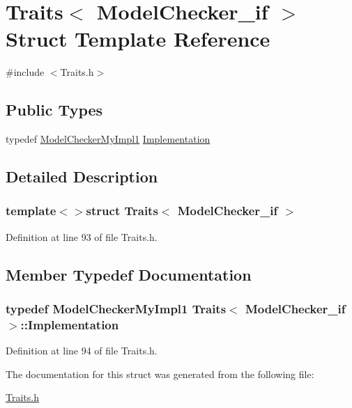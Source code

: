 \hypertarget{struct_traits_3_01_model_checker__if_01_4}{\section{Traits$<$ Model\-Checker\-\_\-if $>$ Struct Template Reference}
\label{struct_traits_3_01_model_checker__if_01_4}
}


{\ttfamily \#include $<$Traits.\-h$>$}

\subsection*{Public Types}
\begin{DoxyCompactItemize}
\item 
typedef \hyperlink{class_model_checker_my_impl1}{Model\-Checker\-My\-Impl1} \hyperlink{struct_traits_3_01_model_checker__if_01_4_aa969b0d5a3092d9a06c83185140de59b}{Implementation}
\end{DoxyCompactItemize}


\subsection{Detailed Description}
\subsubsection*{template$<$$>$struct Traits$<$ Model\-Checker\-\_\-if $>$}



Definition at line 93 of file Traits.\-h.



\subsection{Member Typedef Documentation}
\hypertarget{struct_traits_3_01_model_checker__if_01_4_aa969b0d5a3092d9a06c83185140de59b}{
\subsubsection[{Implementation}]{\setlength{\rightskip}{0pt plus 5cm}typedef {\bf Model\-Checker\-My\-Impl1} {\bf Traits}$<$ {\bf Model\-Checker\-\_\-if} $>$\-::{\bf Implementation}}}\label{struct_traits_3_01_model_checker__if_01_4_aa969b0d5a3092d9a06c83185140de59b}


Definition at line 94 of file Traits.\-h.



The documentation for this struct was generated from the following file\-:\begin{DoxyCompactItemize}
\item 
\hyperlink{_traits_8h}{Traits.\-h}\end{DoxyCompactItemize}

